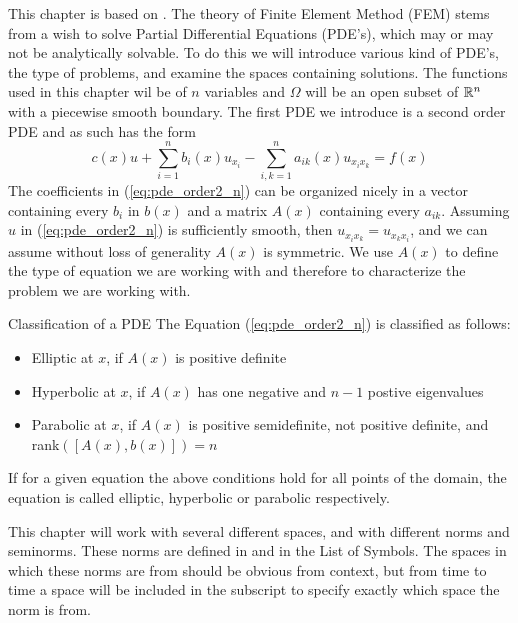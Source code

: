 This chapter is based on \cite{Braess}.
The theory of Finite Element Method (FEM) stems from a 
wish to solve Partial Differential Equations (PDE's),
which may or may not be analytically solvable. 
To do this we will introduce various kind of PDE's, 
the type of
problems, and examine the spaces containing solutions. 
The functions used in this chapter wil be of $n$ 
variables and $\Omega$ will be 
an open subset of $\mathbb{R}^n$ with a piecewise smooth boundary.
The first PDE we introduce is a second order PDE and as 
such has the form
\begin{equation}
	 c(x) u + \sum_{i=1}^{n}b_i(x)u_{x_{i}}
	- \sum_{i,k=1}^{n}a_{ik}(x)u_{x_i x_k}\label{eq:pde_order2_n}
	= f(x)
\end{equation}
The coefficients in (\ref*{eq:pde_order2_n}) can be 
organized nicely in a vector containing every $b_i$ 
in $b(x)$
and a matrix $A(x)$ containing every $a_{ik}$.
Assuming $u$ in (\ref*{eq:pde_order2_n}) is sufficiently 
smooth, then $u_{x_i x_k} =u_{x_k x_i} $, and we can 
assume without loss of generality $A(x)$ is 
symmetric. %
We use $A(x)$ to define the type of equation we are working 
with and therefore to characterize the problem we are 
working with.
\begin{defn}{Classification of a PDE}
	The Equation (\ref{eq:pde_order2_n}) is classified as follows:
	\begin{itemize}
		\item Elliptic at $x$, if $A(x)$ is positive definite
		\item Hyperbolic at $x$, if $A(x)$ has one negative and $n-1$ postive eigenvalues
		\item Parabolic at $x$, if $A(x)$ is positive semidefinite, not positive definite, and rank$([A(x), b(x)])=n$
	\end{itemize}
	If for a given equation the above conditions hold for all points of the domain, the equation is called elliptic, hyperbolic or parabolic respectively.
\end{defn}
This chapter will work with several different spaces, and with different norms and 
seminorms. 
These norms are defined in \cite{Braess} and in the List of Symbols. 
The spaces in which these norms are from should be obvious from context, but from 
time to time a space will be included in the subscript to specify exactly which 
space the norm is from.